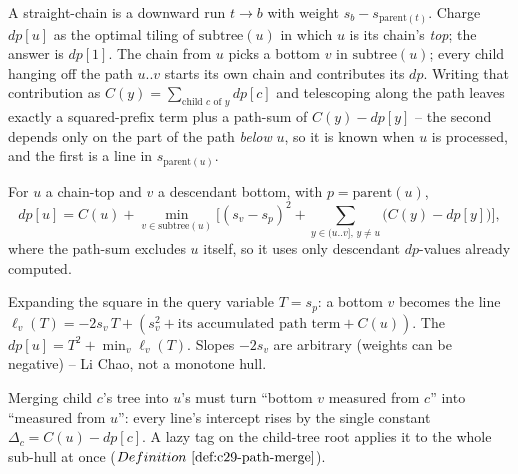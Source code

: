 A straight-chain is a downward run \(t\to b\) with weight \(s_b-s_{\text{parent}(t)}\).
Charge \(\mathit{dp}[u]\) as the optimal tiling of \(\mathrm{subtree}(u)\) in which
\(u\) is its chain's \emph{top}; the answer is \(\mathit{dp}[1]\).  The chain from
\(u\) picks a bottom \(v\) in \(\mathrm{subtree}(u)\); every child hanging off the
path \(u..v\) starts its own chain and contributes its \(\mathit{dp}\).  Writing
that contribution as \(C(y)=\sum_{\text{child }c\text{ of }y}\mathit{dp}[c]\) and
telescoping along the path leaves exactly a squared-prefix term plus a
path-sum of \(C(y)-\mathit{dp}[y]\) -- the second depends only on the part of the
path \emph{below} \(u\), so it is known when \(u\) is processed, and the first is
a line in \(s_{\text{parent}(u)}\).

\begin{observation}
For \(u\) a chain-top and \(v\) a descendant bottom, with \(p=\text{parent}(u)\),
\[
\mathit{dp}[u]=C(u)+\min_{v\in\mathrm{subtree}(u)}\Big[(s_v-s_{p})^2
+\!\sum_{y\in(u..v],\,y\ne u}\!\big(C(y)-\mathit{dp}[y]\big)\Big],
\]
where the path-sum excludes \(u\) itself, so it uses only descendant
\(\mathit{dp}\)-values already computed.
\end{observation}
\begin{observation}
Expanding the square in the query variable \(T=s_p\): a bottom \(v\) becomes the
line \(\ell_v(T)=-2s_v\,T+(s_v^2+\text{its accumulated path term}+C(u))\).  The
\(\mathit{dp}[u]=T^2+\min_v\ell_v(T)\).  Slopes \(-2s_v\) are arbitrary (weights
can be negative) -- Li Chao, not a monotone hull.
\end{observation}
\begin{observation}
Merging child \(c\)'s tree into \(u\)'s must turn ``bottom \(v\) measured from
\(c\)'' into ``measured from \(u\)'': every line's intercept rises by the single
constant \(\Delta_c=C(u)-\mathit{dp}[c]\).  A lazy tag on the child-tree root
applies it to the whole sub-hull at once (\(\defref{c29-path-merge}\)).
\end{observation}

